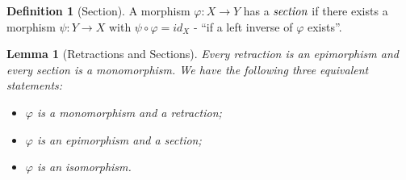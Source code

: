 \documentclass[10pt, oneside, reqno]{amsart}
\theoremstyle{plain}%
\newtheorem{lem}[thm]{Lemma}
\theoremstyle{definition}
\newtheorem{defn}[thm]{Definition}
\theoremstyle{remark}
\newcommand{\Id}{\mathit{id}_}
\begin{document}
\begin{defn}[Section]
 A morphism $\varphi: X \to Y$ has a $\emph{section}$ if there exists a morphism $\psi: Y \to X$ with $\psi \circ \varphi = \Id{X}$ - ``if a left inverse of $\varphi$ exists''.
\end{defn}

\begin{lem}[Retractions and Sections]
Every retraction is an epimorphism and every section is a monomorphism.
We have the following three equivalent statements:
\begin{itemize}
\item $\varphi$ is a monomorphism and a retraction;
\item $\varphi$ is an epimorphism and a section;
\item $\varphi$ is an isomorphism.
\end{itemize}
\end{lem}
\end{document}
